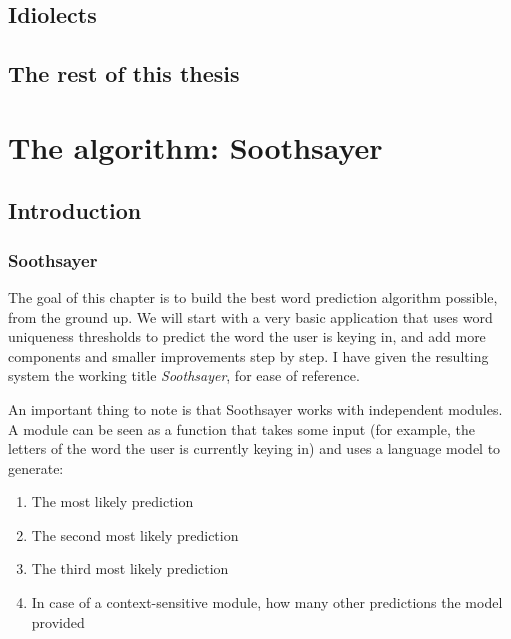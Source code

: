 \documentclass[12pt]{article}
\let\stdsection\section
\renewcommand\section{\newpage\stdsection}
\begin{document}

\subsection{Idiolects}



\subsection{The rest of this thesis} \label{restofthisthesis}






\section{The algorithm: Soothsayer} \label{algorithm}

\subsection{Introduction}

\subsubsection{Soothsayer} \label{ss_intro}
The goal of this chapter is to build the best word prediction algorithm possible, from the ground up. We will start with a very basic application that uses word uniqueness thresholds to predict the word the user is keying in, and add more components and smaller improvements step by step. I have given the resulting system the working title \emph{Soothsayer}, for ease of reference.

An important thing to note is that Soothsayer works with independent modules. A module can be seen as a function that takes some input (for example, the letters of the word the user is currently keying in) and uses a language model to generate:

\begin{enumerate}
\item The most likely prediction
\item The second most likely prediction
\item The third most likely prediction
\item In case of a context-sensitive module, how many other predictions the model provided
\end{enumerate}
\end{document}
